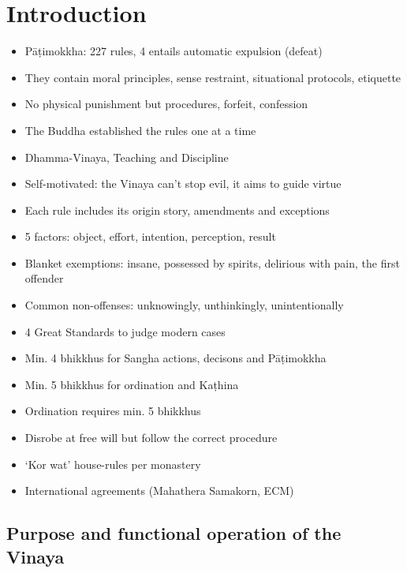 \chapter{Introduction}

\begin{itemize}
\tightlist
\item
  Pāṭimokkha: 227 rules, 4 entails automatic expulsion (defeat)
\item
  They contain moral principles, sense restraint, situational protocols,
  etiquette
\item
  No physical punishment but procedures, forfeit, confession
\item
  The Buddha established the rules one at a time
\item
  Dhamma-Vinaya, Teaching and Discipline
\item
  Self-motivated: the Vinaya can't stop evil, it aims to guide virtue
\item
  Each rule includes its origin story, amendments and exceptions
\item
  5 factors: object, effort, intention, perception, result
\item
  Blanket exemptions: insane, possessed by spirits, delirious with pain,
  the first offender
\item
  Common non-offenses: unknowingly, unthinkingly, unintentionally
\item
  4 Great Standards to judge modern cases
\item
  Min. 4 bhikkhus for Sangha actions, decisons and Pāṭimokkha
\item
  Min. 5 bhikkhus for ordination and Kaṭhina
\item
  Ordination requires min. 5 bhikkhus
\item
  Disrobe at free will but follow the correct procedure
\item
  `Kor wat' house-rules per monastery
\item
  International agreements (Mahathera Samakorn, ECM)
\end{itemize}

\section{Purpose and functional operation of the Vinaya}

